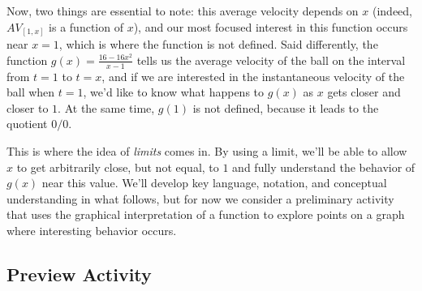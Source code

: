 \documentclass[10pt,]{book}
\theoremstyle{plain}
\theoremstyle{definition}
\theoremstyle{definition}
\theoremstyle{definition}
\theoremstyle{definition}
\theoremstyle{definition}
\numberwithin{equation}{section}
\begin{document}
Now, two things are essential to note: this average velocity depends on \(x\) (indeed, \(AV_{[1,x]}\) is a function of \(x\)), and our most focused interest in this function occurs near \(x = 1\), which is where the function is not defined. Said differently, the function \(g(x) = \frac{16 - 16x^2}{x-1}\) tells us the average velocity of the ball on the interval from \(t = 1\) to \(t = x\), and if we are interested in the instantaneous velocity of the ball when \(t = 1\), we'd like to know what happens to \(g(x)\) as \(x\) gets closer and closer to \(1\). At the same time, \(g(1)\) is not defined, because it leads to the quotient \(0/0\).
%
\par

This is where the idea of \emph{limits} comes in. By using a limit, we'll be able to allow \(x\) to get arbitrarily close, but not equal, to \(1\) and fully understand the behavior of \(g(x)\) near this value. We'll develop key language, notation, and conceptual understanding in what follows, but for now we consider a preliminary activity that uses the graphical interpretation of a function to explore points on a graph where interesting behavior occurs.
%
\typeout{************************************************}
\typeout{************************************************}
\subsection[{Preview Activity}]{Preview Activity}\label{PA-1-2}
\end{document}
